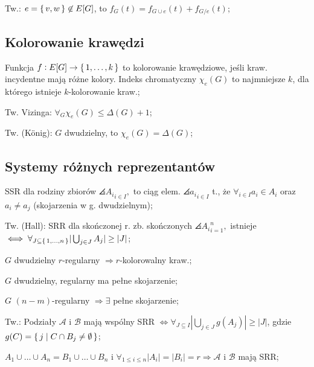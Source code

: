 \entry
Tw.: $e = \set{v, w} \not\in E[G]$, to $f_G(t)=f_{G\cup e}(t) + f_{G/e}(t)$;

\subsection{Kolorowanie krawędzi}

\entry
Funkcja $f: E[G] \rightarrow \set{1, \dots, k}$ to kolorowanie krawędziowe,
  jeśli kraw. incydentne mają różne kolory. Indeks chromatyczny $\chi_e(G)$ to
  najmniejsze $k$, dla którego istnieje $k$-kolorowanie kraw.;

\entry
Tw. Vizinga: $\forall_G \chi_e(G) \leq \Delta(G) +1$;

\entry
Tw. (K{\"o}nig): $G$ dwudzielny, to $\chi_e(G) = \Delta(G)$;

\subsection{Systemy różnych reprezentantów}

\entry
SSR dla rodziny zbiorów $\angles{A_i}_{i\in I},$ to ciąg elem.
  $\angles{a_i}_{i\in I}$ t., że
  $\forall_{i\in I} a_i \in A_i$ oraz $a_i \neq a_j$
  (skojarzenia w g. dwudzielnym);

\entry
Tw. (Hall): SRR dla skończonej r. zb. skończonych $\angles{A_i}_{i=1}^n,$
  istnieje
  $\iff \forall_{J\subseteq\set{1,\dots,n}} |\bigcup_{j\in J}A_j| \geq |J|$;

\entry
$G$ dwudzielny $r$-regularny $\Rightarrow r$-kolorowalny kraw.;

\entry
$G$ dwudzielny, regularny ma pełne skojarzenie;

\entry
$G$ $(n-m)$-regularny $\Rightarrow \exists$ pełne skojarzenie;

\entry
Tw.: Podziały $\mathcal{A}$ i $\mathcal{B}$ mają wspólny SRR $\Leftrightarrow
  \forall_{J\subseteq I} |\bigcup_{j\in J}g(A_j)| \geq |J|$, gdzie
  $g(C) = \set{j | C \cap B_j \neq \emptyset}$;

\entry
$A_1 \cup \dots \cup A_n = B_1 \cup \dots \cup B_n$ i
  $\forall_{1 \leq i \leq n}|A_i| = |B_i| =r \Rightarrow \mathcal{A}$ i
  $\mathcal{B}$ mają SRR;
